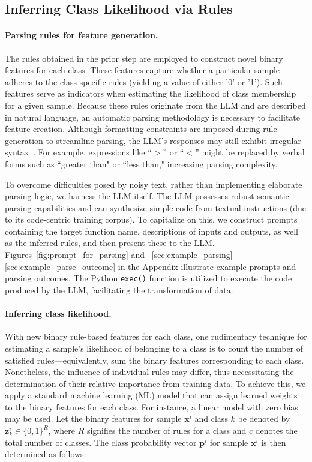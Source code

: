 \subsection{Inferring Class Likelihood via Rules}
\label{Sec:training}

\paragraph{Parsing rules for feature generation.} The rules obtained in the prior step are employed to construct novel binary features for each class. These features capture whether a particular sample adheres to the class-specific rules (yielding a value of either '0' or '1'). Such features serve as indicators when estimating the likelihood of class membership for a given sample. Because these rules originate from the LLM and are described in natural language, an automatic parsing methodology is necessary to facilitate feature creation. Although formatting constraints are imposed during rule generation to streamline parsing, the LLM's responses may still exhibit irregular syntax~\cite{kovavc2023large}. For example, expressions like ``$>$” or ``$<$” might be replaced by verbal forms such as ``greater than" or ``less than," increasing parsing complexity.

To overcome difficulties posed by noisy text, rather than implementing elaborate parsing logic, we harness the LLM itself. The LLM possesses robust semantic parsing capabilities and can synthesize simple code from textual instructions (due to its code-centric training corpus). To capitalize on this, we construct prompts containing the target function name, descriptions of inputs and outputs, as well as the inferred rules, and then present these to the LLM. Figures~\ref{fig:prompt_for_parsing} and ~\ref{sec:example_parsing}-\ref{sec:example_parse_outcome} in the Appendix illustrate example prompts and parsing outcomes. The Python \texttt{exec()} function is utilized to execute the code produced by the LLM, facilitating the transformation of data.

\vspace*{-0.12in}
\paragraph{Inferring class likelihood.} With new binary rule-based features for each class, one rudimentary technique for estimating a sample's likelihood of belonging to a class is to count the number of satisfied rules—equivalently, sum the binary features corresponding to each class. Nonetheless, the influence of individual rules may differ, thus necessitating the determination of their relative importance from training data. To achieve this, we apply a standard machine learning (ML) model that can assign learned weights to the binary features for each class. For instance, a linear model with zero bias may be used. Let the binary features for sample $\mathbf{x}^i$ and class $k$ be denoted by $\mathbf{z}_k^i \in \{0, 1\}^R$, where $R$ signifies the number of rules for a class and $c$ denotes the total number of classes. The class probability vector $\mathbf{p}^i$ for sample $\mathbf{x}^i$ is then determined as follows:

